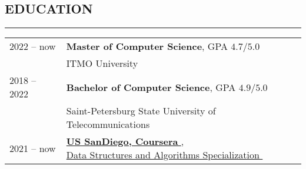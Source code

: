 \documentclass[11pt]{res} %
\let\orighref\href
\renewcommand{\href}[2]{\orighref{#1}{#2\,\faExternalLink}}
\begin{document}
\begin{resume}
        \section{\uppercase{Education}}
        \begin{spacing}{0.3}
            \textcolor[RGB]{220,220,220}{\rule{\linewidth}{0.4pt}}
        \end{spacing}
        \begin{tabular}[t]{l l}
            2022 -- now & \textbf{Master of Computer Science}, GPA $4.7/5.0$\\
            & ITMO University \\
            2018 -- 2022 & \textbf{Bachelor of Computer Science}, GPA $4.9/5.0$  \\
            & Saint-Petersburg State University of Telecommunications                                                                                                              \\
            2021 -- now & \makecell[l]{\textbf{\href{hhttps://www.coursera.org/ucsd}{US SanDiego, Coursera}}, \\
            \href{https://www.coursera.org/specializations/data-structures-algorithms}{Data Structures and Algorithms Specialization}}
        \end{tabular}




    \end{resume}
\end{document}
